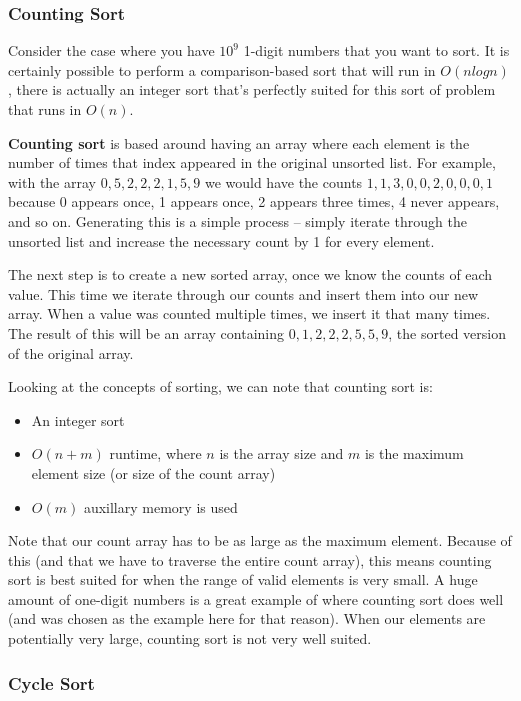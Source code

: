 \subsubsection{Counting Sort}

Consider the case where you have $10^9$ 1-digit numbers that you want to sort. It is certainly possible to perform a comparison-based sort that will run in $O(n log n)$, there is actually an integer sort that's perfectly suited for this sort of problem that runs in $O(n)$.

\textbf{Counting sort} is based around having an array where each element is the number of times that index appeared in the original unsorted list. For example, with the array $0,5,2,2,2,1,5,9$ we would have the counts $1,1,3,0,0,2,0,0,0,1$ because 0 appears once, 1 appears once, 2 appears three times, 4 never appears, and so on. Generating this is a simple process -- simply iterate through the unsorted list and increase the necessary count by 1 for every element.

The next step is to create a new sorted array, once we know the counts of each value. This time we iterate through our counts and insert them into our new array. When a value was counted multiple times, we insert it that many times. The result of this will be an array containing $0,1,2,2,2,5,5,9$, the sorted version of the original array.


Looking at the concepts of sorting, we can note that counting sort is:
\begin{itemize}
\item An integer sort
\item $O(n+m)$ runtime, where $n$ is the array size and $m$ is the maximum element size (or size of the count array)
\item $O(m)$ auxillary memory is used
\end{itemize}

Note that our count array has to be as large as the maximum element. Because of this (and that we have to traverse the entire count array), this means counting sort is best suited for when the range of valid elements is very small. A huge amount of one-digit numbers is a great example of where counting sort does well (and was chosen as the example here for that reason). When our elements are potentially very large, counting sort is not very well suited.

\subsubsection{Cycle Sort}
 

